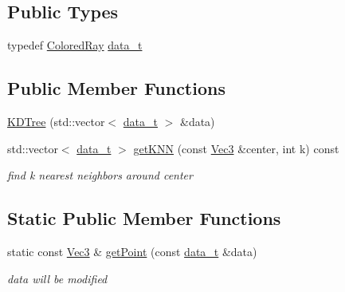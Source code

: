 \subsection*{Public Types}
\begin{DoxyCompactItemize}
\item 
typedef \hyperlink{structColoredRay}{Colored\+Ray} \hyperlink{classKDTree_ab000d86d0fb4aaedcc83b5b7a584c25e}{data\+\_\+t}
\end{DoxyCompactItemize}
\subsection*{Public Member Functions}
\begin{DoxyCompactItemize}
\item 
\hyperlink{classKDTree_a4c0f47702f2326bef96eac59184502b4}{K\+D\+Tree} (std\+::vector$<$ \hyperlink{classKDTree_ab000d86d0fb4aaedcc83b5b7a584c25e}{data\+\_\+t} $>$ \&data)
\item 
std\+::vector$<$ \hyperlink{classKDTree_ab000d86d0fb4aaedcc83b5b7a584c25e}{data\+\_\+t} $>$ \hyperlink{classKDTree_af77f46cd77a1a798cf911a521563d3b3}{get\+K\+NN} (const \hyperlink{vec_8h_ae4fcaa7c0a3935930ed1be5f70b90373}{Vec3} \&center, int k) const 
\begin{DoxyCompactList}\small\item\em find {\ttfamily k} nearest neighbors around {\ttfamily center} \end{DoxyCompactList}\end{DoxyCompactItemize}
\subsection*{Static Public Member Functions}
\begin{DoxyCompactItemize}
\item 
static const \hyperlink{vec_8h_ae4fcaa7c0a3935930ed1be5f70b90373}{Vec3} \& \hyperlink{classKDTree_a40fd2a926b4d28ec387372553c51749b}{get\+Point} (const \hyperlink{classKDTree_ab000d86d0fb4aaedcc83b5b7a584c25e}{data\+\_\+t} \&data)
\begin{DoxyCompactList}\small\item\em {\ttfamily data} will be modified \end{DoxyCompactList}\end{DoxyCompactItemize}
